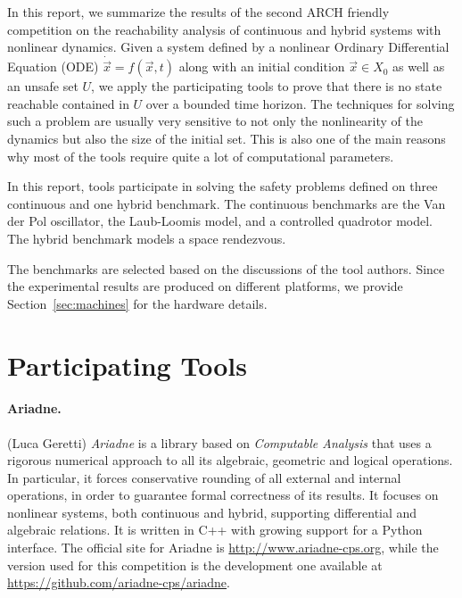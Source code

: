 \documentclass[EPiC]{easychair}
\begin{document}
In this report, we summarize the results of the second ARCH friendly competition on the reachability analysis of continuous and hybrid systems with nonlinear dynamics. Given a system defined by a nonlinear Ordinary Differential Equation (ODE) $\dot{\vec{x}} = f(\vec{x},t)$ along with an initial condition $\vec{x} \in X_0$ as well as an unsafe set $U$, we apply the participating tools to prove that there is no state reachable contained in $U$ over a bounded time horizon. The techniques for solving such a problem are usually very sensitive to not only the nonlinearity of the dynamics but also the size of the initial set. This is also one of the main reasons why most of the tools require quite a lot of computational parameters.


In this report, \toolnumber{} tools \toolnames{} participate in solving the safety problems defined on three continuous and one hybrid benchmark. The continuous benchmarks are the Van der Pol oscillator, the Laub-Loomis model, and a controlled quadrotor model. The hybrid benchmark models a space rendezvous.

The benchmarks are selected based on the discussions of the tool authors. Since the experimental results are produced on different platforms, we provide Section~\ref{sec:machines} for the hardware details.



\section{Participating Tools}
\label{sect:tools}

\paragraph{Ariadne.} (Luca Geretti) \textit{Ariadne} \cite{collins-adhs2012, benvenuti-ijrnc2014} is a library based on \textit{Computable Analysis} \cite{Weihrauch2000} that uses a rigorous numerical approach to all its algebraic, geometric and logical operations. In particular, it forces conservative rounding of all external and internal operations, in order to guarantee formal correctness of its results. It focuses on nonlinear systems, both continuous and hybrid, supporting differential and algebraic relations. It is written in C++ with growing support for a Python interface. The official site for Ariadne is \url{http://www.ariadne-cps.org}, while the version used for this competition is the development one available at \url{https://github.com/ariadne-cps/ariadne}.
\end{document}
